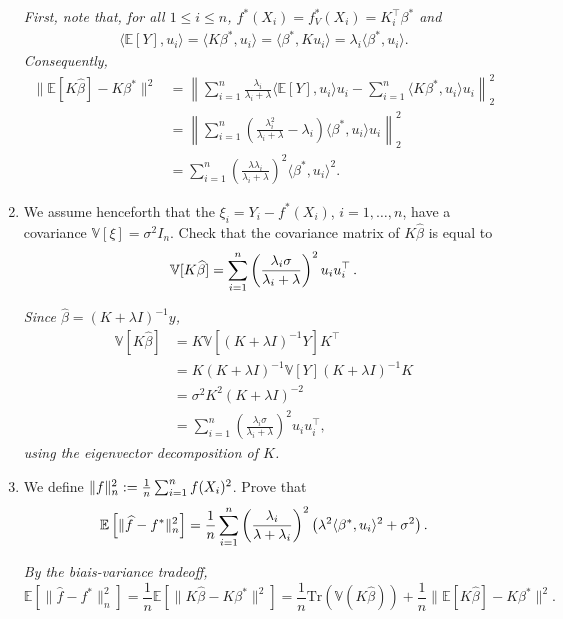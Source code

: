 \documentclass[a4paper,10pt,fleqn]{article}
\newcommand{\E}{\ensuremath{\mathbb{E}}}
\newcommand{\V}{\ensuremath{\mathbb{V}}}
\newcommand{\1}{\ensuremath{\mathbbm{1}}}
\begin{document}
\begin{enumerate}
{\em
First, note that, for all $1 \leq i \leq n$, $f^*(X_i) = f^*_V(X_i) = K_i^\top \beta^*$ and 
		\begin{align*}
			\langle \E [Y], u_i \rangle  = \langle K \beta^* , u_i\rangle 
			= \langle \beta^* , K u_i\rangle = \lambda_i \langle \beta^* , u_i\rangle.
		\end{align*}
		Consequently, 
		\begin{align*}
			\| \E [K \widehat{\beta}] - K \beta^* \|^2 
			& = \left\| \sum_{i=1}^n \frac{\lambda_i}{\lambda_i + \lambda} \langle \E [Y], u_i \rangle u_i - \sum_{i=1}^n \langle K \beta^*, u_i \rangle u_i  \right\|_2^2 \\
			& = \left\| \sum_{i=1}^n \left( \frac{\lambda_i^2}{\lambda_i + \lambda} - \lambda_i \right)  \langle \beta^*, u_i \rangle u_i \right\|_2^2 \\
			& = \sum_{i=1}^n \left( \frac{\lambda \lambda_i }{\lambda_i + \lambda}\right)^2 \langle \beta^*, u_i \rangle^2.
		\end{align*}
}
	\item We assume henceforth that the $\xi_{i}=Y_{i}-f^*(X_{i})$, $i=1,\ldots,n$, have a covariance $\mathbb{V}[\xi]=\sigma^2I_{n}$.
	Check that the covariance matrix of $K\widehat \beta$ is equal to
	$$\mathbb{V}[K\widehat \beta]=\sum_{i=1}^n \left(\lambda_{i}\sigma\over \lambda_{i}+\lambda\right)^2u_{i}u_{i}^\top\,.$$

\vspace{.2cm}

{\em
Since $\widehat{\beta} = (K + \lambda I)^{-1}y$, 
		\begin{align*}
			\mathbb{V}[K \widehat{\beta}] & = K \mathbb{V}[ (K + \lambda I)^{-1} Y ] K^\top\\
			& = K (K + \lambda I)^{-1} \mathbb{V}[Y](K + \lambda I)^{-1} K\\
			& = \sigma^2 K^2 (K + \lambda I)^{-2}\\
			& = \sum_{i=1}^n \left( \frac{\lambda_i \sigma }{\lambda_i + \lambda}\right)^2 u_i u_i^\top,
		\end{align*}
	using the eigenvector decomposition of $K$.
}
	\item We define $\|f\|_{n}^2:= {1\over n}\sum_{i=1}^nf(X_{i})^2$. Prove that
	$$\E\left[\|\widehat f - f^*\|^2_{n} \right]={1\over n}\sum_{i=1}^n \left( \lambda_{i}\over \lambda+\lambda_{i}\right)^2 \left(\lambda^2\langle \beta^*, u_{i}\rangle^2+\sigma^2\right).$$

\vspace{.2cm}

{\em
By the biais-variance tradeoff,
$$
\E\left[\|\widehat f - f^*\|^2_{n} \right] = \frac{1}{n} \E\left[\|K\widehat\beta - K\beta^*\|^2\right] = \frac{1}{n}\mathrm{Tr}(\V(K\widehat\beta)) + \frac{1}{n} \|\E[K\widehat\beta] - K\beta^*\|^2.
$$
}
\end{enumerate}
\end{document}
